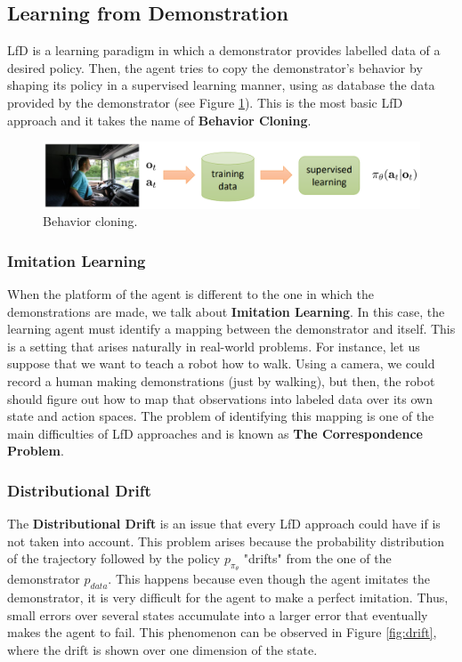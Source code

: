 \subsection{Learning from Demonstration}

LfD is a learning paradigm in which a demonstrator provides labelled data of a desired policy. Then, the agent tries to copy the demonstrator's behavior by shaping its policy in a supervised learning manner, using as database the data provided by the demonstrator (see Figure \ref{fig:b_cloning}). This is the most basic LfD approach and it takes the name of \textbf{Behavior Cloning}.

\begin{figure}[h]
    \centering
    \includegraphics[width=0.9\linewidth]{imagenes/cap1/b_cloning.png}
    \caption{Behavior cloning. \protect\footnotemark}
    \label{fig:b_cloning}
\end{figure}

\subsubsection{Imitation Learning}

When the platform of the agent is different to the one in which the demonstrations are made, we talk about \textbf{Imitation Learning}. In this case, the learning agent must identify a mapping between the demonstrator and itself. This is a setting that arises naturally in real-world problems. For instance, let us suppose that we want to teach a robot how to walk. Using a camera, we could record a human making demonstrations (just by walking), but then, the robot should figure out how to map that observations into labeled data over its own state and action spaces. The problem of identifying this mapping is one of the main difficulties of LfD approaches and is known as \textbf{The Correspondence Problem}.

\subsubsection{Distributional Drift}

The \textbf{Distributional Drift} is an issue that every LfD approach could have if is not taken into account. This problem arises because the probability distribution of the trajectory followed by the policy $p_{\pi_{\theta}}$ "drifts" from the one of the demonstrator $p_{data}$. This happens because even though the agent imitates the demonstrator, it is very difficult for the agent to make a perfect imitation. Thus, small errors over several states accumulate into a larger error that eventually makes the agent to fail. This phenomenon can be observed in Figure \ref{fig:drift}, where the drift is shown over one dimension of the state.

